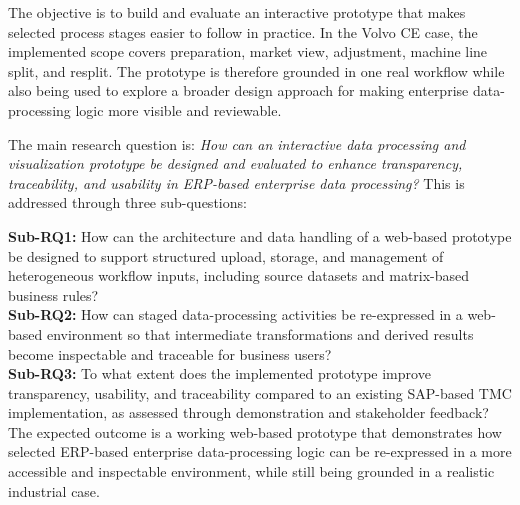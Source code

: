 The objective is to build and evaluate an interactive prototype that makes selected process stages easier to follow in practice. In the Volvo CE case, the implemented scope covers preparation, market view, adjustment, machine line split, and resplit. The prototype is therefore grounded in one real workflow while also being used to explore a broader design approach for making enterprise data-processing logic more visible and reviewable.


The main research question is:
\textit{How can an interactive data processing and visualization prototype be designed and evaluated to enhance transparency, traceability, and usability in ERP-based enterprise data processing?}
This is addressed through three sub-questions:

\textbf{Sub-RQ1:} How can the architecture and data handling of a web-based prototype be designed to support structured upload, storage, and management of heterogeneous workflow inputs, including source datasets and matrix-based business rules?\\

\textbf{Sub-RQ2:} How can staged data-processing activities be re-expressed in a web-based environment so that intermediate transformations and derived results become inspectable and traceable for business users?\\

\textbf{Sub-RQ3:} To what extent does the implemented prototype improve transparency, usability, and traceability compared to an existing SAP-based TMC implementation, as assessed through demonstration and stakeholder feedback?\\

The expected outcome is a working web-based prototype that demonstrates how selected ERP-based enterprise data-processing logic can be re-expressed in a more accessible and inspectable environment, while still being grounded in a realistic industrial case.










